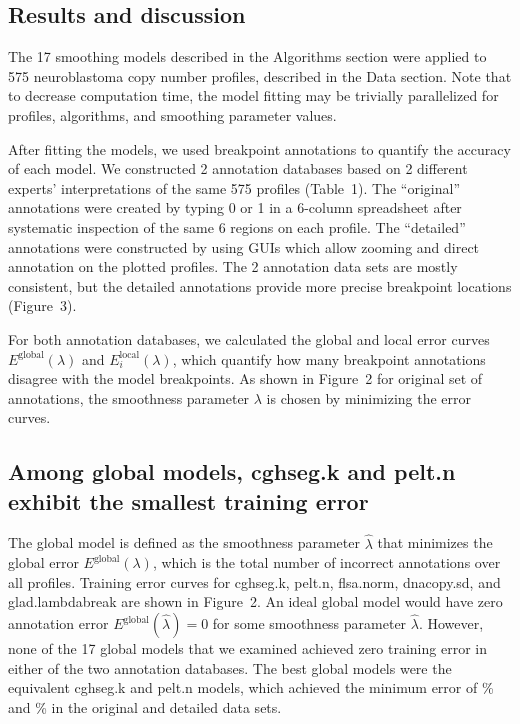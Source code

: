 \documentclass[10pt]{bmc_article}
\newcommand{\model}[1]{#1}
\newenvironment{bmcformat}{\begin{raggedright}\baselineskip20pt\sloppy\setboolean{publ}{false}}{\end{raggedright}\baselineskip20pt\sloppy}
\begin{document}
\begin{bmcformat}
\section*{Results and discussion}\label{results}

The 17 smoothing models described in the Algorithms section were
applied to 575 neuroblastoma copy number profiles, described in the
Data section. Note that to decrease computation time, the model
fitting may be trivially parallelized for profiles, algorithms, and
smoothing parameter values.

After fitting the models, we used breakpoint annotations to quantify
the accuracy of each model. We constructed 2 annotation databases
based on 2 different experts' interpretations of the same 575 profiles
(Table~1). The ``original'' annotations were created by typing 0 or 1
in a 6-column spreadsheet after systematic inspection of the same 6
regions on each profile. The ``detailed'' annotations were constructed
by using GUIs which allow zooming and direct annotation on the plotted
profiles. The 2 annotation data sets are mostly consistent, but the
detailed annotations provide more precise breakpoint locations
(Figure~3).

For both annotation databases, we calculated the global and local
error curves $E^{\text{global}}(\lambda)$ and
$E_i^{\text{local}}(\lambda)$, which quantify how many breakpoint
annotations disagree with the model breakpoints. As shown in Figure~2
for original set of annotations, the smoothness parameter $\lambda$ is
chosen by minimizing the error curves.


\subsection*{Among global models, \model{cghseg.k} 
and \model{pelt.n}
  exhibit the smallest training error}

The global model is defined as the smoothness parameter $\hat \lambda$
that minimizes the global error $E^{\text{global}}(\lambda)$, which is
the total number of incorrect annotations over all profiles.  Training
error curves for cghseg.k, pelt.n, flsa.norm, dnacopy.sd, and
glad.lambdabreak are shown in Figure~2. An ideal global model would
have zero annotation error $E^{\text{global}}(\hat \lambda)=0$ for
some smoothness parameter $\hat \lambda$. However, none of the 17
global models that we examined achieved zero training error in either
of the two annotation databases. The best global models were the
equivalent \model{cghseg.k} and \model{pelt.n} models, which achieved
the minimum error of \unskip\% and
\unskip\% in the original and detailed data
sets.



\end{bmcformat}
\end{document}
